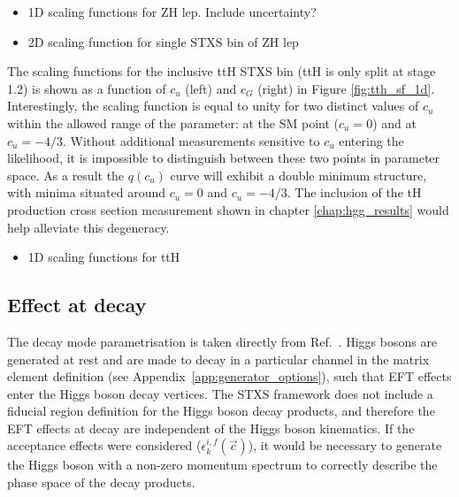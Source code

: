 \begin{itemize}
    \item 1D scaling functions for ZH lep. Include uncertainty?
    \item 2D scaling function for single STXS bin of ZH lep
\end{itemize}

The scaling functions for the inclusive ttH STXS bin (ttH is only split at stage 1.2) is shown as a function of $c_u$ (left) and $c_G$ (right) in Figure \ref{fig:tth_sf_1d}. Interestingly, the scaling function is equal to unity for two distinct values of $c_u$ within the allowed range of the parameter: at the SM point ($c_u=0$) and at $c_u=-4/3$. Without additional measurements sensitive to $c_u$ entering the likelihood, it is impossible to distinguish between these two points in parameter space. As a result the $q(c_u)$ curve will exhibit a double minimum structure, with minima situated around $c_u=0$ and $c_u=-4/3$. The inclusion of the tH production cross section measurement shown in chapter \ref{chap:hgg_results} would help alleviate this degeneracy.

\begin{itemize}
    \item 1D scaling functions for ttH
\end{itemize}


\subsection{Effect at decay}
The decay mode parametrisation is taken directly from Ref.~\cite{Hays:2673969}. Higgs bosons are generated at rest and are made to decay in a particular channel in the matrix element definition (see Appendix~\ref{app:generator_options}), such that EFT effects enter the Higgs boson decay vertices. The STXS framework does not include a fiducial region definition for the Higgs boson decay products, and therefore the EFT effects at decay are independent of the Higgs boson kinematics. If the acceptance effects were considered ($\epsilon^{i,f}_k(\vec{c})$), it would be necessary to generate the Higgs boson with a non-zero momentum spectrum to correctly describe the phase space of the decay products. 

